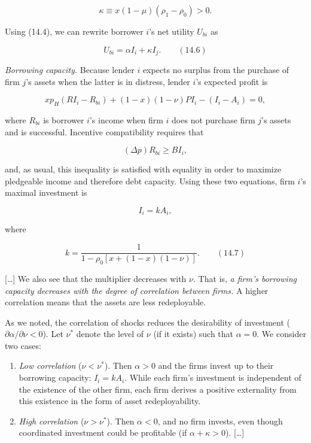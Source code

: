 \documentclass[11pt,a4paper]{article}
\begin{document}
\[\kappa \equiv x(1 - \mu)(\rho_1 - \rho_0) > 0.\]

Using (14.4), we can rewrite borrower \(i\)'s net utility \(U_{bi}\) as

\[U_{bi} = \alpha I_i + \kappa I_j. \qquad (14.6)\]

\emph{Borrowing capacity.} Because lender \(i\) expects no surplus from the purchase of firm \(j\)'s
assets when the latter is in distress, lender \(i\)'s expected profit is

\[xp_H(RI_i - R_{bi}) + (1 - x)(1 - \nu)PI_i - (I_i - A_i) = 0,\]

where \(R_{bi}\) is borrower \(i\)'s income when firm \(i\) does not purchase firm \(j\)'s assets
and is successful. Incentive compatibility requires that

\[(\Delta p)R_{bi} \geqslant BI_i,\]

and, as usual, this inequality is satisfied with equality in order to maximize pledgeable income and
therefore debt capacity. Using these two equations, firm \(i\)'s maximal investment is

\[I_i = kA_i,\]

where

\[k = \frac{1}{1 - \rho_0[x + (1 - x)(1 - \nu)]}. \qquad (14.7)\]

{[}\ldots{]} We also see that the multiplier decreases with \(\nu\). That is, \emph{a firm's
borrowing capacity decreases with the degree of correlation between firms.} A higher correlation
means that the assets are less redeployable.

As we noted, the correlation of shocks reduces the desirability of investment
(\(\partial\alpha/\partial\nu < 0\)). Let \(\nu^*\) denote the level of \(\nu\) (if it exists) such
that \(\alpha = 0\). We consider two cases:

\begin{enumerate}
\def\labelenumi{(\alph{enumi})}
\item
  \emph{Low correlation} (\(\nu < \nu^*\)). Then \(\alpha > 0\) and the firms invest up to their
  borrowing capacity: \(I_i = kA_i\). While each firm's investment is independent of the existence
  of the other firm, each firm derives a positive externality from this existence in the form of
  asset redeployability.
\item
  \emph{High correlation} (\(\nu > \nu^*\)). Then \(\alpha < 0\), and no firm invests, even though
  coordinated investment could be profitable (if \(\alpha + \kappa > 0\)). {[}\ldots{]}
\end{enumerate}
\end{document}
